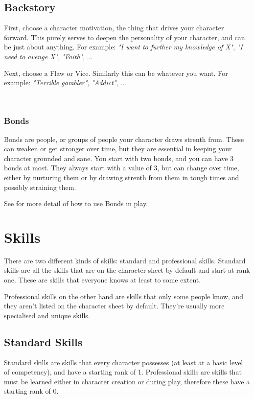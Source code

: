 \section{Backstory}


First, choose a character motivation, the thing that drives your character forward. 
This purely serves to deepen the personality of your character, and can be just about anything.
For example: \textit{"I want to further my knowledge of X"}, \textit{"I need to avenge X"}, \textit{"Faith"}, ...

Next, choose a Flaw or Vice. Similarly this can be whatever you want.
For example: \textit{"Terrible gambler"}, \textit{"Addict"}, ...

\

\subsection{Bonds}
Bonds are people, or groups of people your character draws strenth from. 
These can weaken or get stronger over time, but they are essential in keeping your character grounded and sane.
You start with two bonds, and you can have 3 bonds at most. 
They always start with a value of 3, but can change over time, 
either by nurturing them or by drawing strenth from them in tough times and possibly straining them.

See  for more detail of how to use Bonds in play.

\chapter{Skills}
There are two different kinds of skills: standard and professional skills.
Standard skills are all the skills that are on the character sheet by default and start at rank one.
These are skills that everyone knows at least to some extent.

Professional skills on the other hand are skills that only some people know, 
and they aren't listed on the character sheet by default. 
They're usually more specialised and unique skills.

\section{Standard Skills}
Standard skills are skills that every character possesses (at least at a basic level of competency),
and have a starting rank of 1. 
Professional skills are skills that must be learned either in character creation or during play,
therefore these have a starting rank of 0. 

